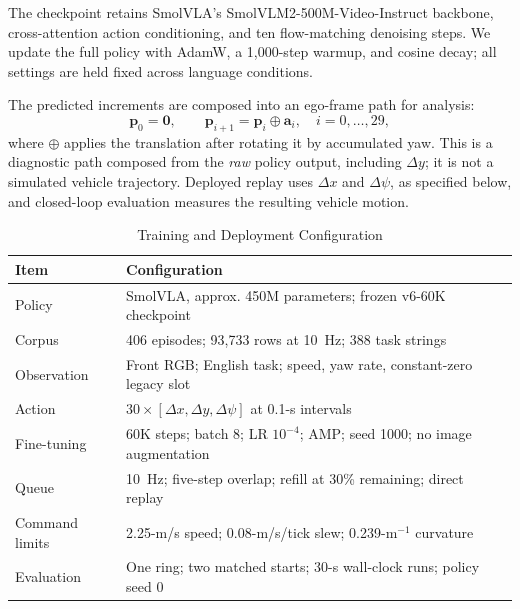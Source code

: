\documentclass[letterpaper,conference]{IEEEtran}
\begin{document}
The checkpoint retains SmolVLA's SmolVLM2-500M-Video-Instruct backbone,
cross-attention action conditioning, and ten flow-matching denoising steps. We
update the full policy with AdamW, a 1,000-step warmup, and cosine decay; all
settings are held fixed across language conditions.

The predicted increments are composed into an ego-frame path for analysis:
\begin{equation}
\mathbf{p}_0=\mathbf{0},\qquad
\mathbf{p}_{i+1}=\mathbf{p}_i\oplus\mathbf{a}_i,\quad i=0,\ldots,29,
\label{eq:compose}
\end{equation}
where $\oplus$ applies the translation after rotating it by accumulated yaw.
This is a diagnostic path composed from the \emph{raw} policy output, including
$\Delta y$; it is not a simulated vehicle trajectory. Deployed replay uses
$\Delta x$ and $\Delta\psi$, as specified below, and closed-loop evaluation
measures the resulting vehicle motion.

\begin{table}[!ht]
\caption{Training and Deployment Configuration}
\label{tab:configuration}
\centering
\footnotesize
\setlength{\tabcolsep}{3.0pt}
\begin{tabular}{@{}L{0.28\columnwidth}L{0.64\columnwidth}@{}}
\toprule
Item & Configuration \\
\midrule
Policy & SmolVLA, approx. 450M parameters; frozen v6-60K checkpoint \\
Corpus & 406 episodes; 93,733 rows at 10~Hz; 388 task strings \\
Observation & Front RGB; English task; speed, yaw rate, constant-zero legacy slot \\
Action & $30\times[\Delta x,\Delta y,\Delta\psi]$ at 0.1-s intervals \\
Fine-tuning & 60K steps; batch 8; LR $10^{-4}$; AMP; seed 1000; no image augmentation \\
Queue & 10~Hz; five-step overlap; refill at 30\% remaining; direct replay \\
Command limits & 2.25-m/s speed; 0.08-m/s/tick slew; 0.239-m$^{-1}$ curvature \\
Evaluation & One ring; two matched starts; 30-s wall-clock runs; policy seed 0 \\
\bottomrule
\end{tabular}
\end{table}
\end{document}
